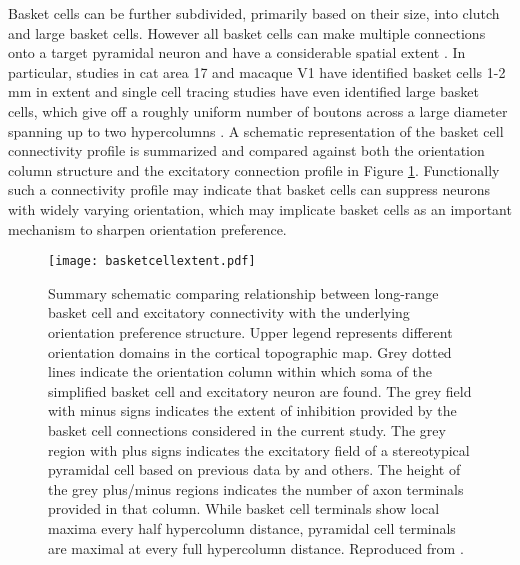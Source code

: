 Basket cells can be further subdivided, primarily based on their size,
into clutch and large basket cells. However all basket cells can make
multiple connections onto a target pyramidal neuron
\citep{Somogyi1983} and have a considerable spatial extent
\citep{Kisvarday2002}. In particular, studies in cat area 17 and
macaque V1 have identified basket cells 1-2 mm in extent
\citep{Somogyi1983,Lund1987,Lund1991,Martin1983} and single cell
tracing studies have even identified large basket cells, which give
off a roughly uniform number of boutons across a large diameter
spanning up to two hypercolumns \citep{Buzas2001}. A schematic
representation of the basket cell connectivity profile is summarized
and compared against both the orientation column structure and the
excitatory connection profile in Figure
\ref{BasketCellExtent}. Functionally such a connectivity profile may
indicate that basket cells can suppress neurons with widely varying
orientation, which may implicate basket cells as an important
mechanism to sharpen orientation preference.

\begin{figure}
	\centering
        \texttt{[image: basketcellextent.pdf]}
	\caption[Schematic representing the proposed spatial distribution
      of pyramidal and basket cell extents and their relationship to
      the orientation map in V1. Reproduced from
      \cite{Buzas2001}.]{Summary schematic comparing relationship
      between long-range basket cell and excitatory connectivity with
      the underlying orientation preference structure. Upper legend
      represents different orientation domains in the cortical
      topographic map. Grey dotted lines indicate the orientation
      column within which soma of the simplified basket cell and
      excitatory neuron are found. The grey field with minus signs
      indicates the extent of inhibition provided by the basket cell
      connections considered in the current study. The grey region
      with plus signs indicates the excitatory field of a
      stereotypical pyramidal cell based on previous data by
      \cite{Bosking1997,Kisvarday1997a} and others. The height of the
      grey plus/minus regions indicates the number of axon terminals
      provided in that column. While basket cell terminals show local
      maxima every half hypercolumn distance, pyramidal cell terminals
      are maximal at every full hypercolumn distance. Reproduced from
      \cite{Buzas2001}.}
	\label{BasketCellExtent}
\end{figure}

